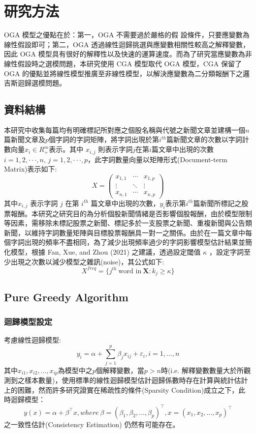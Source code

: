 \chapter{研究方法}
OGA 模型之優點在於：第一，OGA 不需要過於嚴格的假 設條件，只要應變數為線性假設即可；第二，OGA 透過線性迴歸挑選與應變數相關性較高之解釋變數，因此 OGA 模型具有很好的解釋性以及快速的運算速度。而為了研究當應變數為非線性假設時之選模問題，本研究使用 CGA 模型取代 OGA 模型，CGA 保留了 OGA 的優點並將線性模型推廣至非線性模型，以解決應變數為二分類報酬下之邏吉斯迴歸選模問題。
\section{資料結構}
本研究中收集每篇均有明確標記所對應之個股名稱與代號之新聞文章並建構一個$n$篇新聞文章及$p$個字詞的字詞矩陣，將字詞出現於第$i^{th}$篇新聞文章的次數以字詞計數向量$x_i \in R_+^m$表示。其中 $x_{i,j}$ 則表示字詞$j$在第$i$篇文章中出現的次數$i = 1,2,··· ,n\text{,  }j = 1,2,··· ,p$，此字詞數量向量以矩陣形式(Document-term Matrix)表示如下:
\begin{equation}
X=\begin{pmatrix*}
x_{1,1} & \cdots & x_{1,p} \\
\vdots & \ddots & \vdots \\
x_{n,1} & \cdots & x_{n,p}
\end{pmatrix*}
\end{equation}
{其中$x_{i,j}$ 表示字詞 $j$ 在第 $i^{th}$  篇文章中出現的次數，$y_i$表示第$i^{th}$篇新聞所標記之股票報酬。本研究之研究目的為分析個股新聞情緒是否影響個股報酬，由於模型限制等因素，需移除未標記股票之新聞、標記多於一支股票之新聞、重複新聞與公告類新聞，以維持字詞數量矩陣與目標股票報酬具一對一之關係。由於在一篇文章中每個字詞出現的頻率不盡相同，為了減少出現頻率過少的字詞影響模型估計結果並簡化模型，根據 Fan, Xue, and Zhou (2021) 之建議，透過設定閾值 $\kappa$ ，設定字詞至少出現之次數以減少模型之雜訊(noise)，其公式如下:
}
\begin{equation}
X^{freq}=\{j^{th}~\text{word in}~\bm{X}:k_j \geq \kappa \}
\end{equation}
\section{Pure Greedy Algorithm}
\subsection{迴歸模型設定}
\noindent
考慮線性迴歸模型:
\begin{equation}
\displaystyle y_{i}=\alpha + \sum^{p}_{j=1} \beta_{j}x_{ij}+\varepsilon_{i}, i=1,\ldots,n
\end{equation}
其中$x_{i1},x_{i2},\ldots,x_{ip}$為模型中之$p$個解釋變數，當$p > n$時(i.e. 解釋變數數量大於所觀測到之樣本數量)，使用標準的線性迴歸模型估計迴歸係數時存在計算與統計估計上的困難，然而許多研究證實在稀疏性的條件(Sparsity Condition)成立之下，此時迴歸模型：
\begin{equation}
y(x)=\alpha+\beta^{\top}x, where~\beta=(\beta_{1},\beta_{2},\ldots,\beta_{p})^{\top}, x=(x_{1},x_{2},...,x_{p})^{\top}
\end{equation}
之一致性估計(Consistency Estimation) 仍然有可能存在。

